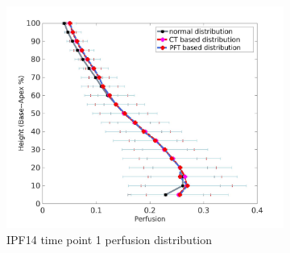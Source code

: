 \begin{figure}[htbp]
\begin{subfigure}{.6\linewidth}
  \includegraphics[width=\linewidth,trim={{.0\wd0} {.0\wd0} {.0\wd0} {.0\wd0}},clip]{Appendix/Image_AppexB/IPF1401/IPF1401_PerfusionAgainstLungHeight.png}
  \caption{IPF14 time point 1 perfusion distribution}
  \label{fig:IPF1401VQDistribution-b}
\end{subfigure}
\begin{subfigure}{.6\linewidth}%

\end{subfigure}
\end{figure}
